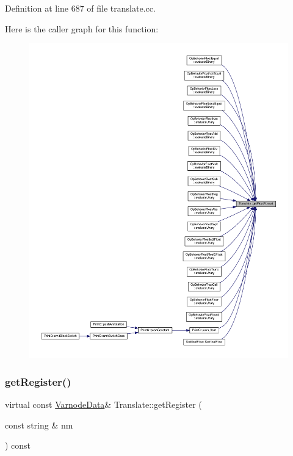 Definition at line 687 of file translate.\+cc.

Here is the caller graph for this function\+:
\nopagebreak
\begin{figure}[H]
\begin{center}
\leavevmode
\includegraphics[width=350pt]{class_translate_ae501a3e3bdaee00d49ed9f2b8545e6c8_icgraph}
\end{center}
\end{figure}
\mbox{\label{class_translate_a3a62c460db4eccc285fa3dd29dd4a29b}} 
\subsubsection{\texorpdfstring{getRegister()}{getRegister()}}
{\footnotesize\ttfamily virtual const \mbox{\hyperlink{struct_varnode_data}{Varnode\+Data}}\& Translate\+::get\+Register (\begin{DoxyParamCaption}\item[{const string \&}]{nm }\end{DoxyParamCaption}) const\hspace{0.3cm}{\ttfamily [pure virtual]}}




